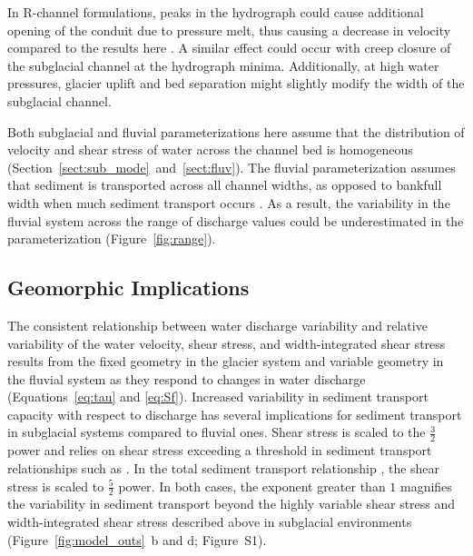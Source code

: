 \documentclass[11pt]{article}
\begin{document}
\begin{spacing}{1}
          In R-channel formulations, peaks in the hydrograph could cause additional opening of the conduit due to pressure melt, thus causing a decrease in velocity compared to the results here \citep{rothlisberger1972}.
          A similar effect could occur with creep closure of the subglacial channel at the hydrograph minima.
          Additionally, at high water pressures, glacier uplift and bed separation \citep{andrews2014} might slightly modify the width of the subglacial channel. 

          Both subglacial and fluvial parameterizations here assume that the distribution of velocity and shear stress of water across the channel bed is homogeneous (Section~\ref{sect:sub_mode}~and~\ref{sect:fluv}). 
          The fluvial parameterization assumes that sediment is transported across all channel widths, as opposed to bankfull width when much sediment transport occurs \citep{wolman1960}.
          As a result, the variability in the fluvial system across the range of discharge values could be underestimated in the parameterization (Figure~\ref{fig:range}).
        
        
          
          \subsection{Geomorphic Implications}
          \label{sect:GI}
          The consistent relationship between water discharge variability and relative variability of the water velocity, shear stress, and width-integrated shear stress results from the fixed geometry in the glacier system and variable geometry in the fluvial system as they respond to changes in water discharge (Equations~\ref{eq:tau} and \ref{eq:Sf}).
          Increased variability in sediment transport capacity with respect to discharge has several implications for sediment transport in subglacial systems compared to fluvial ones.
          Shear stress is scaled to the $\frac{3}{2}$ power  and relies on shear stress exceeding a threshold in sediment transport relationships  such as \citet{meyer1948}.
          In the total sediment transport relationship \citet{engelund1967}, the shear stress is scaled to $\frac{5}{2}$ power.
          In both cases, the exponent greater than $1$ magnifies the variability in sediment transport beyond the highly variable shear stress and width-integrated shear stress described above in subglacial environments (Figure~\ref{fig:model_outs}\, b and d; Figure~S1).


\end{spacing}
\end{document}
